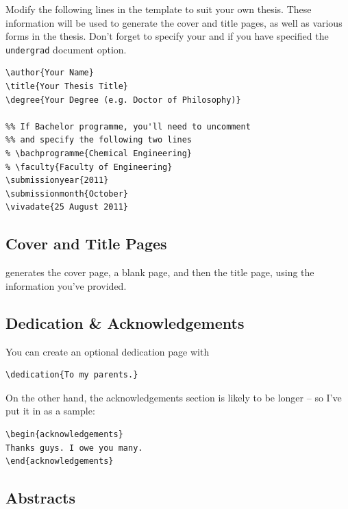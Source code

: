 \documentclass[a4paper,nofonts,raggedright,titlepage,openany]{tufte-book}
\begin{document}
Modify the following lines in the template to suit your own thesis. These information will be used to generate the cover and title pages, as well as various forms in the thesis. Don't forget to specify your \texttt{\faculty} and \texttt{\bachprogramme} if you have specified the \texttt{undergrad} document option.

\begin{verbatim}
\author{Your Name}
\title{Your Thesis Title}
\degree{Your Degree (e.g. Doctor of Philosophy)}

%% If Bachelor programme, you'll need to uncomment 
%% and specify the following two lines
% \bachprogramme{Chemical Engineering}
% \faculty{Faculty of Engineering}
\submissionyear{2011}
\submissionmonth{October}
\vivadate{25 August 2011}
\end{verbatim}


\subsection{Cover and Title Pages}

\texttt{\makecoverandtitlepage} generates the cover page,  a blank page, and then the title page, using the information you've provided.

\subsection{Dedication \& Acknowledgements}

You can create an optional dedication page with 
\begin{verbatim}
\dedication{To my parents.}
\end{verbatim}

On the other hand, the acknowledgements section is likely to be longer -- so I've put it in  as a sample:

\begin{verbatim}
\begin{acknowledgements}
Thanks guys. I owe you many.
\end{acknowledgements}
\end{verbatim}

\subsection{Abstracts}
\end{document}
